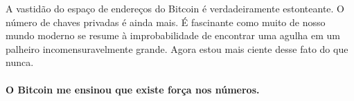 A vastidão do espaço de endereços do Bitcoin é verdadeiramente estonteante. O número de chaves privadas é ainda mais. É fascinante como muito de nosso mundo moderno se resume à improbabilidade de encontrar uma agulha em um palheiro incomensuravelmente grande. Agora estou mais ciente desse fato do que nunca.

\paragraph{O Bitcoin me ensinou que existe força nos números.}

%
%
%
%

